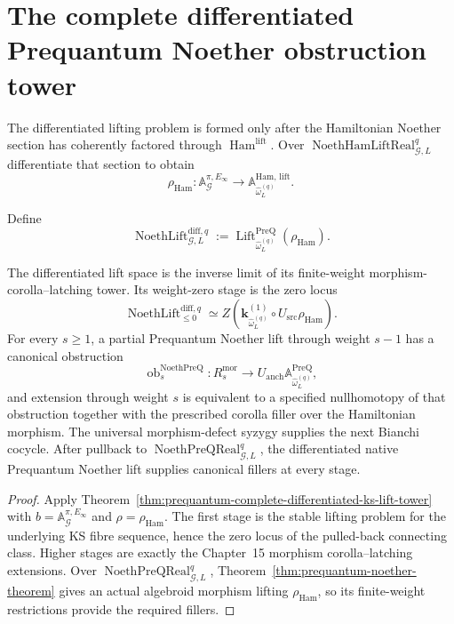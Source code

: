\section{The complete differentiated Prequantum Noether obstruction tower}
\label{sec:prequantum-noether-obstruction-tower}

The differentiated lifting problem is formed only after the Hamiltonian Noether
section has coherently factored through
$\operatorname{Ham}^{\mathrm{lift}}$.  Over
$\operatorname{NoethHamLiftReal}_{\mathcal G,L}^{q}$ differentiate that section to
obtain
\[
\rho_{\mathrm{Ham}}:
\mathbb A_{\mathcal G}^{\pi,E_\infty}
\longrightarrow
\mathbb A_{\widehat\omega_L^{(q)}}^{\mathrm{Ham,\,lift}}.
\]

\begin{definition}
\label{def:prequantum-differentiated-noether-lift-space}
Define
\[
\boxed{
\operatorname{NoethLift}^{\mathrm{diff},q}_{\mathcal G,L}
:=
\operatorname{Lift}^{\mathrm{PreQ}}_{\widehat\omega_L^{(q)}}
(\rho_{\mathrm{Ham}}).
}
\]
\end{definition}

\begin{theorem}
\label{thm:prequantum-first-higher-noether-obstructions}
The differentiated lift space is the inverse limit of its finite-weight
morphism-corolla--latching tower.  Its weight-zero stage is the zero locus
\[
\boxed{
\operatorname{NoethLift}^{\mathrm{diff},q}_{\le0}
\simeq
Z\left(
\mathbf k_{\widehat\omega_L^{(q)}}^{(1)}
\circ U_{\mathrm{src}}\rho_{\mathrm{Ham}}
\right).
}
\]
For every $s\ge1$, a partial Prequantum Noether lift through weight $s-1$ has a
canonical obstruction
\[
\operatorname{ob}^{\mathrm{NoethPreQ}}_s:
R_s^{\mathrm{mor}}
\longrightarrow
U_{\mathrm{anch}}\mathbb A_{\widehat\omega_L^{(q)}}^{\mathrm{PreQ}},
\]
and extension through weight $s$ is equivalent to a specified nullhomotopy of
that obstruction together with the prescribed corolla filler over the Hamiltonian
morphism.  The universal morphism-defect syzygy supplies the next Bianchi
cocycle.  After pullback to
$\operatorname{NoethPreQReal}_{\mathcal G,L}^{q}$, the differentiated native
Prequantum Noether lift supplies canonical fillers at every stage.
\end{theorem}

\begin{proof}
Apply
Theorem~\ref{thm:prequantum-complete-differentiated-ks-lift-tower} with
$b=\mathbb A_{\mathcal G}^{\pi,E_\infty}$ and
$\rho=\rho_{\mathrm{Ham}}$.  The first stage is the stable lifting problem for
the underlying KS fibre sequence, hence the zero locus of the pulled-back
connecting class.  Higher stages are exactly the Chapter~15 morphism
corolla--latching extensions.  Over
$\operatorname{NoethPreQReal}_{\mathcal G,L}^{q}$,
Theorem~\ref{thm:prequantum-noether-theorem} gives an actual algebroid morphism
lifting $\rho_{\mathrm{Ham}}$, so its finite-weight restrictions provide the
required fillers.
\end{proof}

